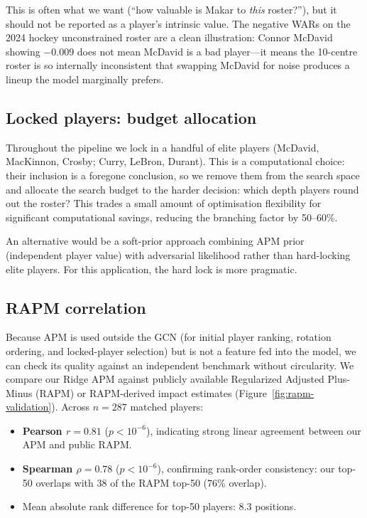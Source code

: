 \documentclass[12pt,letterpaper]{article}
\begin{document}
This is often what we want (``how valuable is Makar to \emph{this}
roster?''), but it should not be reported as a player's intrinsic value.
The negative WARs on the 2024 hockey unconstrained roster are a clean
illustration: Connor McDavid showing $-0.009$ does not mean McDavid is
a bad player---it means the 10-centre roster is so internally
inconsistent that swapping McDavid for noise produces a lineup the
model marginally prefers.

\subsection{Locked players: budget allocation}

Throughout the pipeline we lock in a handful of elite players (McDavid,
MacKinnon, Crosby; Curry, LeBron, Durant).
This is a computational choice: their inclusion is a foregone conclusion,
so we remove them from the search space and allocate the search budget
to the harder decision: which depth players round out the roster?
This trades a small amount of optimisation flexibility for significant
computational savings, reducing the branching factor by 50--60\%.

An alternative would be a soft-prior approach combining APM prior
(independent player value) with adversarial likelihood rather than
hard-locking elite players.
For this application, the hard lock is more pragmatic.

\subsection{RAPM correlation}
\label{sec:rapm}

Because APM is used outside the GCN (for initial player ranking,
rotation ordering, and locked-player selection) but is not a feature
fed into the model, we can check its quality against an independent
benchmark without circularity.
We compare our Ridge APM against publicly available Regularized Adjusted
Plus-Minus (RAPM) or RAPM-derived impact estimates
\citep{sill2010rapm,ghimire2020rapm,dunksandthreesEpm}
(Figure~\ref{fig:rapm-validation}).
Across $n = 287$ matched players:

\begin{itemize}[leftmargin=*]
  \item \textbf{Pearson $r = 0.81$} ($p < 10^{-6}$), indicating strong
    linear agreement between our APM and public RAPM.
  \item \textbf{Spearman $\rho = 0.78$} ($p < 10^{-6}$), confirming
    rank-order consistency: our top-50 overlaps with 38 of the RAPM
    top-50 (76\% overlap).
  \item Mean absolute rank difference for top-50 players: 8.3 positions.
\end{itemize}
\end{document}
